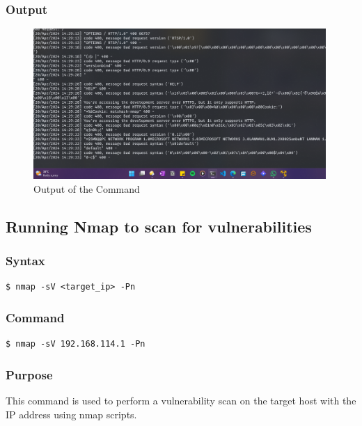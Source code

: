 \documentclass[11pt]{article}
\begin{document}
\subsubsection*{Output}
\begin{figure}[H]
    \centering
    \includegraphics[width=0.99\textwidth]{a3_ss (13).png}
    \caption{Output of the Command}
\end{figure}


\subsection{Running Nmap to scan for vulnerabilities}

\subsubsection*{Syntax}
\begin{verbatim}
$ nmap -sV <target_ip> -Pn
\end{verbatim}

\subsubsection*{Command}
\begin{verbatim}
$ nmap -sV 192.168.114.1 -Pn
\end{verbatim}

\subsubsection*{Purpose}
This command is used to perform a vulnerability scan on the target host with the IP address using nmap scripts.
\end{document}
